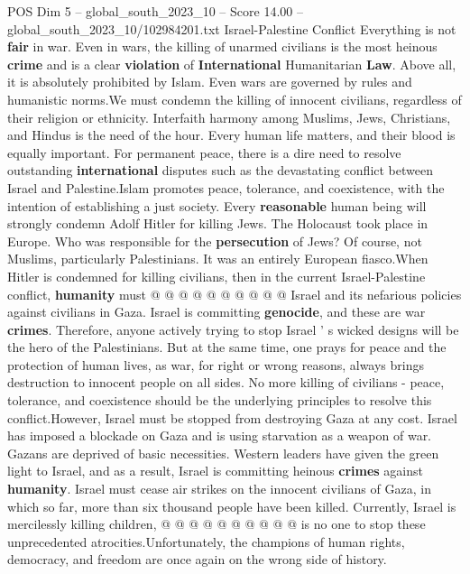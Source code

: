 \begin{textsample}{POS Dim 5 – global\_south\_2023\_10 – Score 14.00 – global\_south\_2023\_10/102984201.txt}  \label{ex:f5_pos_363}
Israel-Palestine Conflict Everything is not \textbf{fair} in war.
Even in wars, the killing of unarmed civilians is the most heinous \textbf{crime} and is a clear \textbf{violation} of \textbf{International} Humanitarian \textbf{Law}.
Above all, it is absolutely prohibited by Islam.
Even wars are governed by rules and humanistic norms.We must condemn the killing of innocent civilians, regardless of their religion or ethnicity.
Interfaith harmony among Muslims, Jews, Christians, and Hindus is the need of the hour.
Every human life matters, and their blood is equally important.
For permanent peace, there is a dire need to resolve outstanding \textbf{international} disputes such as the devastating conflict between Israel and Palestine.Islam promotes peace, tolerance, and coexistence, with the intention of establishing a just society.
Every \textbf{reasonable} human being will strongly condemn Adolf Hitler for killing Jews.
The Holocaust took place in Europe.
Who was responsible for the \textbf{persecution} of Jews?
Of course, not Muslims, particularly Palestinians.
It was an entirely European fiasco.When Hitler is condemned for killing civilians, then in the current Israel-Palestine conflict, \textbf{humanity} must @ @ @ @ @ @ @ @ @ @ Israel and its nefarious policies against civilians in Gaza.
Israel is committing \textbf{genocide}, and these are war \textbf{crimes}.
Therefore, anyone actively trying to stop Israel ' s wicked designs will be the hero of the Palestinians.
But at the same time, one prays for peace and the protection of human lives, as war, for right or wrong reasons, always brings destruction to innocent people on all sides.
No more killing of civilians - peace, tolerance, and coexistence should be the underlying principles to resolve this conflict.However, Israel must be stopped from destroying Gaza at any cost.
Israel has imposed a blockade on Gaza and is using starvation as a weapon of war.
Gazans are deprived of basic necessities.
Western leaders have given the green light to Israel, and as a result, Israel is committing heinous \textbf{crimes} against \textbf{humanity}.
Israel must cease air strikes on the innocent civilians of Gaza, in which so far, more than six thousand people have been killed.
Currently, Israel is mercilessly killing children, @ @ @ @ @ @ @ @ @ @ is no one to stop these unprecedented atrocities.Unfortunately, the champions of human rights, democracy, and freedom are once again on the wrong side of history.

\end{textsample}
